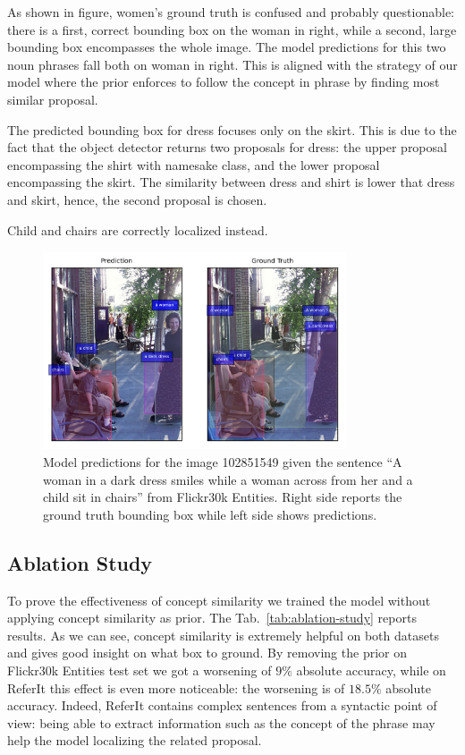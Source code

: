 As shown in figure, women's ground truth is confused and probably
questionable: there is a first, correct bounding box on the woman in
right, while a second, large bounding box encompasses the whole image.
The model predictions for this two noun phrases fall both on woman in
right. This is aligned with the strategy of our model where the prior
enforces to follow the concept in phrase by finding most similar
proposal.

The predicted bounding box for dress focuses only on the skirt. This
is due to the fact that the object detector returns two proposals for
dress: the upper proposal encompassing the shirt with namesake class,
and the lower proposal encompassing the skirt. The similarity between
dress and shirt is lower that dress and skirt, hence, the second
proposal is chosen.

Child and chairs are correctly localized instead.

\begin{figure}
  \centering
  \includegraphics[width=0.8\textwidth]{figures/similing-woman.png}
  \caption[Model predictions for the image 102851549 from Flickr30k
    Entities]{ Model predictions for the image 102851549 given the
    sentence ``A woman in a dark dress smiles while a woman across
    from her and a child sit in chairs'' from Flickr30k Entities.
    Right side reports the ground truth bounding box while left side
    shows predictions.}
  \label{fig:qualitative-results}
\end{figure}

\subsection{Ablation Study}

To prove the effectiveness of concept similarity we trained the model
without applying concept similarity as prior. The
Tab.~\ref{tab:ablation-study} reports results. As we can see, concept
similarity is extremely helpful on both datasets and gives good
insight on what box to ground. By removing the prior on Flickr30k
Entities test set we got a worsening of $9\%$ absolute accuracy, while
on ReferIt this effect is even more noticeable: the worsening is of
$18.5\%$ absolute accuracy. Indeed, ReferIt contains complex sentences
from a syntactic point of view: being able to extract information such
as the concept of the phrase may help the model localizing the related
proposal.

